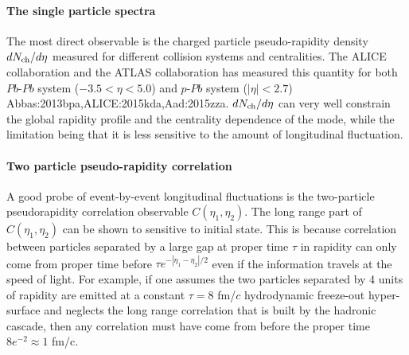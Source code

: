 \paragraph{The single particle spectra}
The most direct observable is the charged particle pseudo-rapidity density $dN_\text{ch}/d\eta$ measured for different collision systems and centralities.
The ALICE collaboration and the ATLAS collaboration has measured this quantity for both $Pb$-$Pb$ system ($-3.5<\eta<5.0$) and $p$-$Pb$ system ($|\eta| < 2.7$) {Abbas:2013bpa,ALICE:2015kda,Aad:2015zza}.
$dN_\text{ch}/d\eta$ can very well constrain the global rapidity profile and the centrality dependence of the mode, while the limitation being that it is less sensitive to the amount of longitudinal fluctuation.

\paragraph{Two particle pseudo-rapidity correlation}
A good probe of event-by-event longitudinal fluctuations is the two-particle pseudorapidity correlation observable $C(\eta_1, \eta_2)$.
The long range part of $C(\eta_1, \eta_2)$ can be shown to sensitive to initial state.
This is because correlation between particles separated by a large gap at proper time $\tau$ in rapidity can only come from proper time before $\tau e^{-|\eta_1-\eta_2|/2}$ even if the information travels at the speed of light.
For example, if one assumes the two particles separated by 4 units of rapidity are emitted at a constant $\tau = 8$ fm/$c$ hydrodynamic freeze-out hyper-surface and neglects the long range correlation that is built by the hadronic cascade, then any correlation must have come from before the proper time $ 8 e^{-2}\approx 1$ fm/c.

